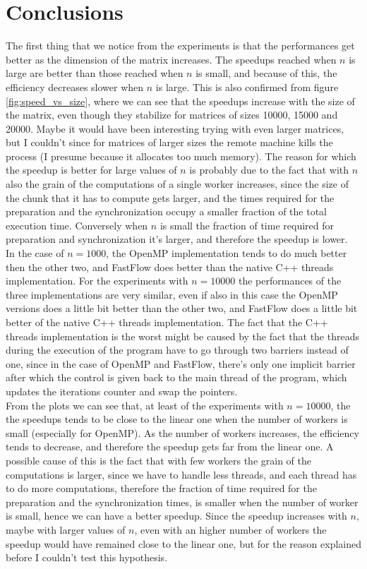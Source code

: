 \documentclass[12pt]{article}
\begin{document}
	\section{Conclusions}
	The first thing that we notice from the experiments is that the performances get better as the dimension of the matrix increases. The speedups reached when $n$ is large are better than those reached when $n$ is small, and because of this, the efficiency decreases slower when $n$ is large. This is also confirmed from figure \ref{fig:speed_vs_size}, where we can see that the speedups increase with the size of the matrix, even though they stabilize for matrices of sizes 10000, 15000 and 20000. Maybe it would have been interesting trying with even larger matrices, but I couldn't since for matrices of larger sizes the remote machine kills the process (I presume because it allocates too much memory). The reason for which the speedup is better for large values of $n$ is probably due to the fact that with $n$ also the grain of the computations of a single worker increases, since the size of the chunk that it has to compute gets larger, and the times required for the preparation and the synchronization occupy a smaller fraction of the total execution time. Conversely when $n$ is small the fraction of time required for preparation and synchronization it's larger, and therefore the speedup is lower.\\
	In the case of $n = 1000$, the OpenMP implementation tends to do much better then the other two, and FastFlow does better than the native C++ threads implementation. For the experiments with $n = 10000$ the performances of the three implementations are very similar, even if also in this case the OpenMP versions does a little bit better than the other two, and FastFlow does a little bit better of the native C++ threads implementation. The fact that the C++ threads implementation is the worst might be caused by the fact that the threads during the execution of the program have to go through two barriers instead of one, since in the case of OpenMP and FastFlow, there's only one implicit barrier after which the control is given back to the main thread of the program, which updates the iterations counter and swap the pointers.\\
	From the plots we can see that, at least of the experiments with $n = 10000$, the the speedups tends to be close to the linear one when the number of workers is small (especially for OpenMP). As the number of workers increases, the efficiency tends to decrease, and therefore the speedup gets far from the linear one. A possible cause of this is the fact that with few workers the grain of the computations is larger, since we have to handle less threads, and each thread has to do more computations, therefore the fraction of time required for the preparation and the synchronization times, is smaller when the number of worker is small, hence we can have a better speedup. Since the speedup increases with $n$, maybe with larger values of $n$, even with an higher number of workers the speedup would have remained close to the linear one, but for the reason explained before I couldn't test this hypothesis.
	
\end{document}
